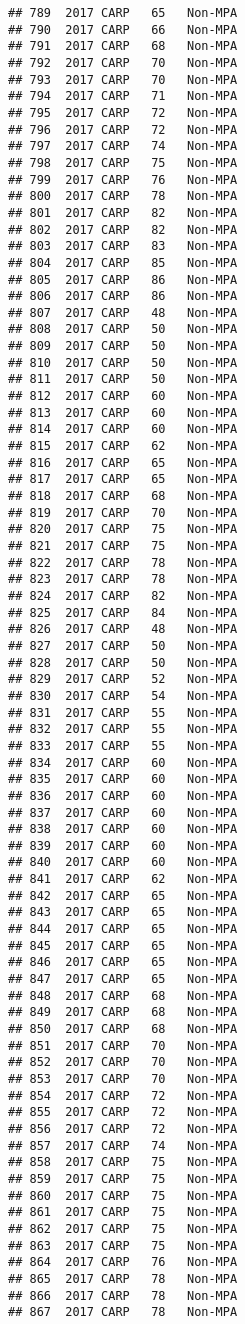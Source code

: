 \documentclass[]{article}
\begin{document}
\begin{verbatim}
## 789  2017 CARP   65   Non-MPA
## 790  2017 CARP   66   Non-MPA
## 791  2017 CARP   68   Non-MPA
## 792  2017 CARP   70   Non-MPA
## 793  2017 CARP   70   Non-MPA
## 794  2017 CARP   71   Non-MPA
## 795  2017 CARP   72   Non-MPA
## 796  2017 CARP   72   Non-MPA
## 797  2017 CARP   74   Non-MPA
## 798  2017 CARP   75   Non-MPA
## 799  2017 CARP   76   Non-MPA
## 800  2017 CARP   78   Non-MPA
## 801  2017 CARP   82   Non-MPA
## 802  2017 CARP   82   Non-MPA
## 803  2017 CARP   83   Non-MPA
## 804  2017 CARP   85   Non-MPA
## 805  2017 CARP   86   Non-MPA
## 806  2017 CARP   86   Non-MPA
## 807  2017 CARP   48   Non-MPA
## 808  2017 CARP   50   Non-MPA
## 809  2017 CARP   50   Non-MPA
## 810  2017 CARP   50   Non-MPA
## 811  2017 CARP   50   Non-MPA
## 812  2017 CARP   60   Non-MPA
## 813  2017 CARP   60   Non-MPA
## 814  2017 CARP   60   Non-MPA
## 815  2017 CARP   62   Non-MPA
## 816  2017 CARP   65   Non-MPA
## 817  2017 CARP   65   Non-MPA
## 818  2017 CARP   68   Non-MPA
## 819  2017 CARP   70   Non-MPA
## 820  2017 CARP   75   Non-MPA
## 821  2017 CARP   75   Non-MPA
## 822  2017 CARP   78   Non-MPA
## 823  2017 CARP   78   Non-MPA
## 824  2017 CARP   82   Non-MPA
## 825  2017 CARP   84   Non-MPA
## 826  2017 CARP   48   Non-MPA
## 827  2017 CARP   50   Non-MPA
## 828  2017 CARP   50   Non-MPA
## 829  2017 CARP   52   Non-MPA
## 830  2017 CARP   54   Non-MPA
## 831  2017 CARP   55   Non-MPA
## 832  2017 CARP   55   Non-MPA
## 833  2017 CARP   55   Non-MPA
## 834  2017 CARP   60   Non-MPA
## 835  2017 CARP   60   Non-MPA
## 836  2017 CARP   60   Non-MPA
## 837  2017 CARP   60   Non-MPA
## 838  2017 CARP   60   Non-MPA
## 839  2017 CARP   60   Non-MPA
## 840  2017 CARP   60   Non-MPA
## 841  2017 CARP   62   Non-MPA
## 842  2017 CARP   65   Non-MPA
## 843  2017 CARP   65   Non-MPA
## 844  2017 CARP   65   Non-MPA
## 845  2017 CARP   65   Non-MPA
## 846  2017 CARP   65   Non-MPA
## 847  2017 CARP   65   Non-MPA
## 848  2017 CARP   68   Non-MPA
## 849  2017 CARP   68   Non-MPA
## 850  2017 CARP   68   Non-MPA
## 851  2017 CARP   70   Non-MPA
## 852  2017 CARP   70   Non-MPA
## 853  2017 CARP   70   Non-MPA
## 854  2017 CARP   72   Non-MPA
## 855  2017 CARP   72   Non-MPA
## 856  2017 CARP   72   Non-MPA
## 857  2017 CARP   74   Non-MPA
## 858  2017 CARP   75   Non-MPA
## 859  2017 CARP   75   Non-MPA
## 860  2017 CARP   75   Non-MPA
## 861  2017 CARP   75   Non-MPA
## 862  2017 CARP   75   Non-MPA
## 863  2017 CARP   75   Non-MPA
## 864  2017 CARP   76   Non-MPA
## 865  2017 CARP   78   Non-MPA
## 866  2017 CARP   78   Non-MPA
## 867  2017 CARP   78   Non-MPA

\end{verbatim}
\end{document}
